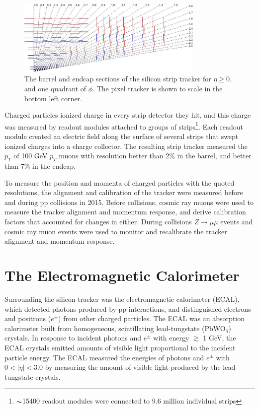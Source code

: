 \begin{figure}[ht]
	\centering
	\includegraphics[width=0.8\textwidth]{figures/siliconStripAndPixelDetectorTwoDimView.png}
	\caption{The barrel and endcap sections of the silicon strip tracker for $\eta \geq 0.$ and one quadrant of $\phi$.  The pixel tracker is shown to scale in the bottom left corner.}
	\label{fig:stripTracker}
\end{figure}

Charged particles ionized charge in every strip detector they hit, and this charge was measured by readout 
modules attached to groups of strips\footnote{$\thicksim$15400 readout modules were connected to 9.6 million individual strips}.  Each readout module created an 
electric field along the surface of several strips that swept ionized charges into a charge collector.  The resulting 
strip tracker measured the $p_{T}$ of 100 GeV $p_{T}$ muons with resolution better than 2\% in the barrel, and 
better than 7\% in the endcap.

To measure the position and momenta of charged particles with the quoted resolutions, the alignment and calibration 
of the tracker were measured before and during pp collisions in 2015.  Before collisions, cosmic ray muons were 
used to measure the tracker alignment and momentum response, and derive calibration factors that accounted for 
changes in either.  During collisions $Z \rightarrow \mu\mu$ events and cosmic ray muon events were used to monitor 
and recalibrate the tracker alignment and momentum response.


\section{The Electromagnetic Calorimeter}
\label{sec:ecalDescription}

Surrounding the silicon tracker was the electromagnetic calorimeter (ECAL), which detected photons produced by 
pp interactions, and distinguished electrons and positrons ($e^{\pm}$) from other charged particles.  
The ECAL was an absorption calorimeter built from homogeneous, scintillating lead-tungstate (PbWO$_{4}$) crystals.  
In response to incident photons and $e^{\pm}$ with energy $\gtrsim$ 1 GeV, the ECAL crystals emitted 
amounts of visible light proportional to the incident particle energy.  The ECAL measured the energies of photons 
and $e^{\pm}$ with $0 < |\eta| < 3.0$ by measuring the amount of visible light produced by the lead-tungstate crystals.

